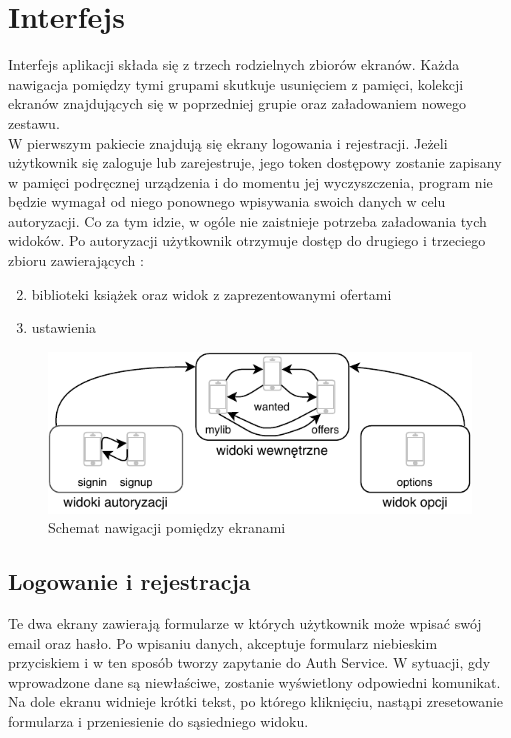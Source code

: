 \chapter{Interfejs}
\label{cha:interfejs}

Interfejs aplikacji składa się z trzech rodzielnych zbiorów ekranów. Każda nawigacja pomiędzy tymi grupami skutkuje usunięciem z pamięci, kolekcji ekranów znajdujących się w poprzedniej grupie oraz załadowaniem nowego zestawu.\\
W pierwszym pakiecie znajdują się ekrany logowania i rejestracji. Jeżeli użytkownik się zaloguje lub zarejestruje, jego token dostępowy zostanie zapisany w pamięci podręcznej urządzenia i do momentu jej wyczyszczenia, program nie będzie wymagał od niego ponownego wpisywania swoich danych w celu autoryzacji. Co za tym idzie, w ogóle nie zaistnieje potrzeba załadowania tych widoków.
Po autoryzacji użytkownik otrzymuje dostęp do drugiego i trzeciego zbioru zawierających :
\begin{enumerate}
    \setcounter{enumi}{1}
    \item biblioteki książek oraz widok z zaprezentowanymi ofertami
    \item ustawienia
\end{enumerate} 

\begin{figure}[H]
	\centering
	\includegraphics[width=\linewidth]{navig.pdf}
	\caption{Schemat nawigacji pomiędzy ekranami}
\end{figure}

\section{Logowanie i rejestracja}
Te dwa ekrany zawierają formularze w których użytkownik może wpisać swój email oraz hasło. Po wpisaniu danych, akceptuje formularz niebieskim przyciskiem i w ten sposób tworzy zapytanie do Auth Service. W sytuacji, gdy wprowadzone dane są niewłaściwe, zostanie wyświetlony odpowiedni komunikat.\\
Na dole ekranu widnieje krótki tekst, po którego kliknięciu, nastąpi zresetowanie formularza i przeniesienie do sąsiedniego widoku.

